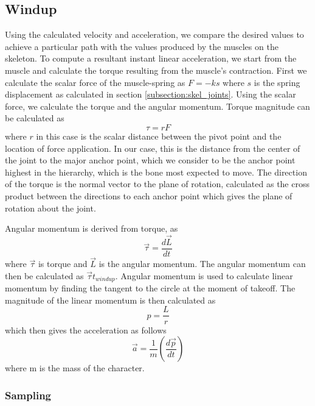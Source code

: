 \subsection{Windup}
\label{subsection:torque_windup}

Using the calculated velocity and acceleration, we compare the desired values to achieve a particular path with the values produced by the muscles on the skeleton.  To compute a resultant instant linear acceleration, we start from the muscle and calculate the torque resulting from the muscle's contraction.  First we calculate the scalar force of the muscle-spring as $F = -k s$ where $s$ is the spring displacement as calculated in section \ref{subsection:skel_joints}.  Using the scalar force, we calculate the torque and the angular momentum.  Torque magnitude can be calculated as \[\tau = r F\] where $r$ in this case is the scalar distance between the pivot point and the location of force application.  In our case, this is the distance from the center of the joint to the major anchor point, which we consider to be the anchor point highest in the hierarchy, which is the bone most expected to move.  The direction of the torque is the normal vector to the plane of rotation, calculated as the cross product between the directions to each anchor point which gives the plane of rotation about the joint.

Angular momentum is derived from torque, as \[\vec{\tau} = \dfrac{d\vec{L}}{dt}\] where $\vec{\tau}$ is torque and $\vec{L}$ is the angular momentum.  The angular momentum can then be calculated as $\vec{\tau} t_{windup}$.  Angular momentum is used to calculate linear momentum by finding the tangent to the circle at the moment of takeoff.  The magnitude of the linear momentum is then calculated as \[p = \frac{L}{r}\] which then gives the acceleration as follows \[ \vec{a} = \frac{1}{m}\left(\dfrac{d\vec{p}}{dt}\right)\] where m is the mass of the character.

\subsubsection{Sampling}
\label{subsubsection:torque_sample}

